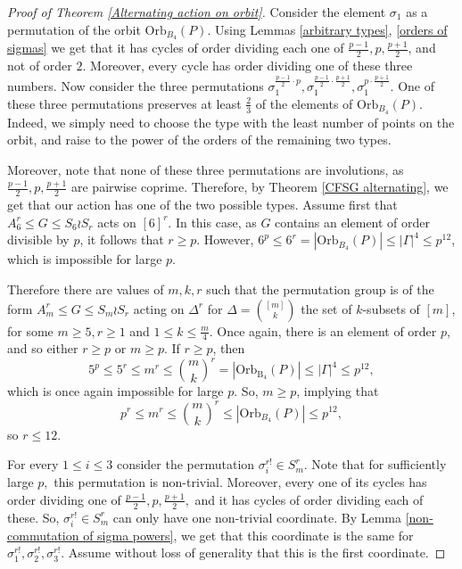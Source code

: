 \documentclass[letterpaper]{amsart}
\begin{document}
\begin{proof}[Proof of Theorem \ref{Alternating action on orbit}]
    Consider the element $\sigma_1$ as a permutation of the orbit $\mathrm{Orb}_{B_4}(P)$. Using Lemmas \ref{arbitrary types}, \ref{orders of sigmas} we get that it has cycles of order dividing each one of $\frac{p-1}{2},p,\frac{p+1}{2}$, and not of order $2$. Moreover, every cycle has order dividing one of these three numbers. Now consider the three permutations $\sigma_1^{\frac{p-1}{2} \cdot p},\sigma_1^{\frac{p-1}{2}\cdot\frac{p+1}{2}},\sigma_1^{p\cdot\frac{p+1}{2}}$. One of these three permutations preserves at least $\frac{2}{3}$ of the elements of $\mathrm{Orb}_{B_4}(P)$. Indeed, we simply need to choose the type with the least number of points on the orbit, and raise to the power of the orders of the remaining two types.

    Moreover, note that none of these three permutations are involutions, as $\frac{p-1}{2},p,\frac{p+1}{2}$ are pairwise coprime. Therefore, by Theorem \ref{CFSG alternating}, we get that our action has one of the two possible types.
    Assume first that $A_6^r \leq G \leq S_6 \wr S_r$ acts on $[6]^r$. In this case, as $G$ contains an element of order divisible by $p$, it follows that $r \geq p$. However, $6^p \leq 6^r = |\mathrm{Orb}_{B_4}(P)| \leq |\Gamma|^4 \leq p^{12}$, which is impossible for large $p$.

    Therefore there are values of $m,k,r$ such that the permutation group is of the form $A_m^r \leq G \leq S_m \wr S_r$ acting on $\Delta^r$ for $\Delta = \binom{[m]}{k}$ the set of $k$-subsets of $[m]$, for some $m \geq 5, r \geq 1$ and $1 \leq k \leq \frac{m}{4}$. Once again, there is an element of order $p$, and so either $r \geq p$ or $m \geq p$. If $r \geq p$, then $$5^p \leq 5^r \leq m^r \leq \binom{m}{k}^r = |\mathrm{Orb}_{\mathrm{B_4}}(P)| \leq |\Gamma|^4 \leq p^{12},$$which is once again impossible for large $p$. So, $m \geq p$, implying that $$p^r \leq m^r \leq \binom{m}{k}^r \leq |\mathrm{Orb}_{B_4}(P)| \leq p^{12},$$ so $r \leq 12$.

    For every $1\leq i \leq 3$ consider the permutation $\sigma_i^{r!} \in S_m^r$. Note that for sufficiently large $p,$ this permutation is non-trivial. Moreover, every one of its cycles has order dividing one of $\frac{p-1}{2},p,\frac{p+1}{2},$ and it has cycles of order dividing each of these. So, $\sigma_i^{r!} \in S_m^r$ can only have one non-trivial coordinate. By Lemma \ref{non-commutation of sigma powers}, we get that this coordinate is the same for $\sigma_1^{r!},\sigma_2^{r!},\sigma_3^{r!}$. Assume without loss of generality that this is the first coordinate.


\end{proof}
\end{document}
